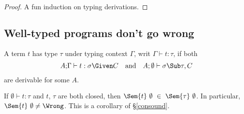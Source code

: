 \documentclass{amsart}
\theoremstyle{definition}
\begin{document}
\begin{proof}
A fun induction on typing derivations.
\end{proof}

\subsection{Well-typed programs don't go wrong}
A term $t$ has type $\tau$ under typing context
$\Gamma$, writ $\Gamma\vdash t:\tau$, if both
\begin{align*}
A;&\Gamma\vdash t : \sigma\Given C&
&\text{and}&
A;\emptyset\vdash\sigma\Sub\tau,C
\end{align*}
are derivable for some $A$.

If $\emptyset\vdash t:\tau$ and $t$, $\tau$ are both closed, then
$\Sem{t}~\emptyset~\in~\Sem{\tau}~\emptyset$. In particular,
$\Sem{t}~\emptyset\neq\Wrong$. This is a corollary of
\S\ref{consound}.




\end{document}
